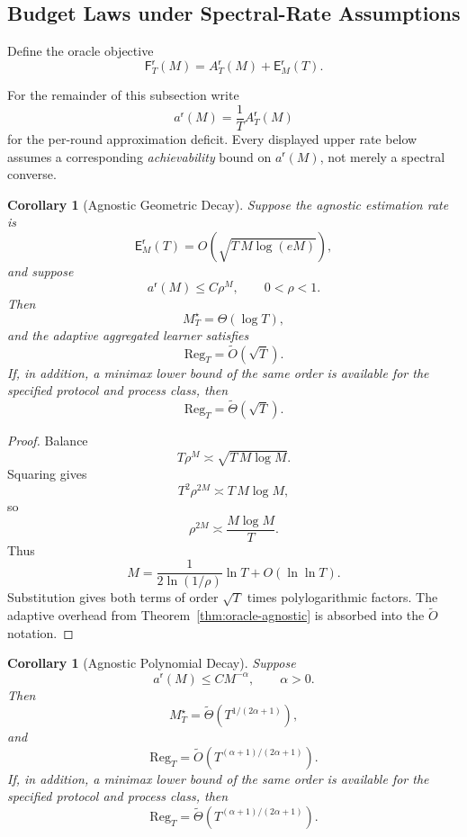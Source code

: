 \documentclass[12pt]{article}
\newtheorem{corollary}[theorem]{Corollary}
\theoremstyle{definition}
\newcommand{\Reg}{\mathrm{Reg}}
\newcommand{\Est}{\mathsf E}
\newcommand{\Aapp}{A_T}
\newcommand{\Fbudget}{\mathsf F}
\begin{document}
\subsection{Budget Laws under Spectral-Rate Assumptions}
\label{subsec:oracle-laws}

Define the oracle objective
\[
\Fbudget_T^{\mathsf r}(M)
=
\Aapp^{\mathsf r}(M)+\Est_M^{\mathsf r}(T).
\]

For the remainder of this subsection write
\[
a^{\mathsf r}(M)
=
\frac1T\Aapp^{\mathsf r}(M)
\]
for the per-round approximation deficit.  Every displayed upper rate below
assumes a corresponding \emph{achievability} bound on $a^{\mathsf r}(M)$, not
merely a spectral converse.

\begin{corollary}[Agnostic Geometric Decay]
\label{cor:geo-agnostic}
Suppose the agnostic estimation rate is
\[
\Est_M^{\mathsf r}(T)
=
O\!\left(\sqrt{T\,M\log(eM)}\right),
\]
and suppose
\[
a^{\mathsf r}(M)\le C\rho^M,
\qquad
0<\rho<1.
\]
Then
\[
M_T^\star
=
\Theta(\log T),
\]
and the adaptive aggregated learner satisfies
\[
\Reg_T
=
\widetilde O(\sqrt T).
\]
If, in addition, a minimax lower bound of the same order is available for the
specified protocol and process class, then
\[
\Reg_T
=
\widetilde\Theta(\sqrt T).
\]
\end{corollary}

\begin{proof}
Balance
\[
T\rho^M
\asymp
\sqrt{T\,M\log M}.
\]
Squaring gives
\[
T^2\rho^{2M}
\asymp
T\,M\log M,
\]
so
\[
\rho^{2M}
\asymp
\frac{M\log M}{T}.
\]
Thus
\[
M
=
\frac{1}{2\ln(1/\rho)}
\ln T
+
O(\ln\ln T).
\]
Substitution gives both terms of order $\sqrt T$ times polylogarithmic factors.
The adaptive overhead from Theorem~\ref{thm:oracle-agnostic} is absorbed into
the $\widetilde O$ notation.
\end{proof}

\begin{corollary}[Agnostic Polynomial Decay]
\label{cor:poly-agnostic}
Suppose
\[
a^{\mathsf r}(M)\le C M^{-\alpha},
\qquad
\alpha>0.
\]
Then
\[
M_T^\star
=
\widetilde\Theta\!\left(T^{1/(2\alpha+1)}\right),
\]
and
\[
\Reg_T
=
\widetilde O\!\left(T^{(\alpha+1)/(2\alpha+1)}\right).
\]
If, in addition, a minimax lower bound of the same order is available for the
specified protocol and process class, then
\[
\Reg_T
=
\widetilde\Theta\!\left(T^{(\alpha+1)/(2\alpha+1)}\right).
\]
\end{corollary}
\end{document}

